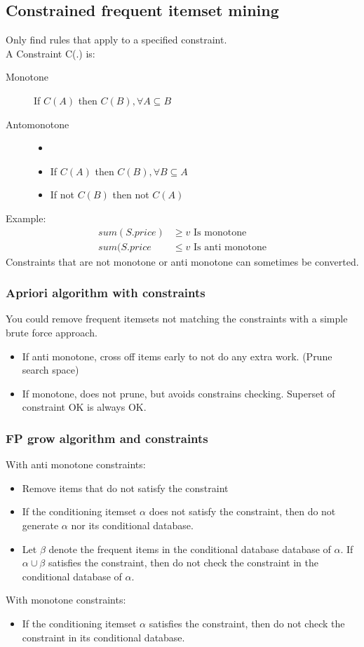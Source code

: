 \documentclass[a4paper]{article}
\begin{document}
\subsection{Constrained frequent itemset mining}
Only find rules that apply to a specified constraint. \\
A Constraint C(.) is:
\begin{description}
		\item[Monotone] If $C(A)$ then $C(B) ,\forall A\subseteq B$
		\item[Antomonotone] 
				\begin{itemize}
						\item
						\item If $C(A)$ then $C(B) ,\forall B\subseteq A$ 
						\item If not $C(B)$ then not $C(A)$
				\end{itemize}
\end{description}
Example:
\begin{align*}
		sum(S.price) &\geq v \mbox{ Is monotone}\\
		sum(S.price &\leq v \mbox{ Is anti monotone}
\end{align*}
Constraints that are not monotone or anti monotone can sometimes be converted.
\subsubsection{Apriori algorithm with constraints}
You could remove frequent itemsets not matching the constraints with a simple
brute force approach. 
\begin{itemize}
		\item If anti monotone, cross off items early to not do any extra work.
				(Prune search space)
		\item If monotone, does not prune, but avoids constrains checking.
				Superset of constraint OK is always OK.
\end{itemize}
\subsubsection{FP grow algorithm and constraints}
With anti monotone constraints:
\begin{itemize}
		\item Remove items that do not satisfy the constraint
		\item If the conditioning itemset $\alpha$ does not satisfy the
				constraint, then do not generate $\alpha$ nor its conditional
				database.
		\item Let $\beta$ denote the frequent items in the conditional database
				database of $\alpha$. If $\alpha \cup \beta$ satisfies the
				constraint, then do not check the constraint in the conditional
				database of $\alpha$.
\end{itemize}
With monotone constraints:
\begin{itemize}
		\item If the conditioning itemset $\alpha$ satisfies the constraint,
				then do not check the constraint in its conditional database.
\end{itemize}
\end{document}
